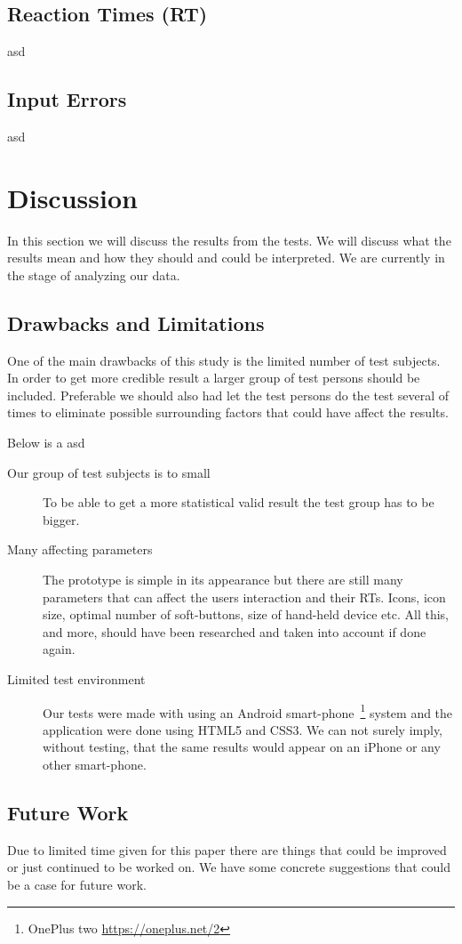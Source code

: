 \documentclass[runningheads,a4paper]{llncs}
\begin{document}
\subsection{Reaction Times (RT)}
asd

\subsection{Input Errors}
asd

\section{Discussion} \label{sec:discussion}
In this section we will discuss the results from the tests. We will discuss what the results mean and how they should and could be interpreted. We are currently in the stage of analyzing our data.

\subsection{Drawbacks and Limitations} \label{subsec:drawbacks}
One of the main drawbacks of this study is the limited number of test subjects. In order to get more credible result a larger group of test persons should be included. Preferable we should also had let the test persons do the test several of times to eliminate possible surrounding factors that could have affect the results. 

Below is a asd
\begin{description}
	\item[Our group of test subjects is to small] To be able to get a more statistical valid result the test group has to be bigger.
	\item[Many affecting parameters] The prototype is simple in its appearance but there are still many parameters that can affect the users interaction and their RTs. Icons, icon size, optimal number of soft-buttons, size of hand-held device etc. All this, and more, should have been researched and taken into account if done again. 
	\item[Limited test environment] Our tests were made with using an Android smart-phone~\footnote{OnePlus two \url{https://oneplus.net/2}} system and the application were done using HTML5 and CSS3. We can not surely imply, without testing, that the same results would appear on an iPhone or any other smart-phone.
\end{description}

\subsection{Future Work}
Due to limited time given for this paper there are things that could be improved or just continued to be worked on. We have some concrete suggestions that could be a case for future work.
\end{document}
